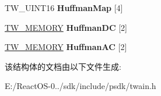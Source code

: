 \begin{DoxyCompactItemize}
T\+W\+\_\+\+U\+I\+N\+T16 {\bfseries Huffman\+Map} \mbox{[}4\mbox{]}
\item 
\mbox{\label{struct_t_w___j_p_e_g_c_o_m_p_r_e_s_s_i_o_n_a984734b0a7500ded1d92818059e5dea4}} 
\hyperlink{struct_t_w___m_e_m_o_r_y}{T\+W\+\_\+\+M\+E\+M\+O\+RY} {\bfseries Huffman\+DC} \mbox{[}2\mbox{]}
\item 
\mbox{\label{struct_t_w___j_p_e_g_c_o_m_p_r_e_s_s_i_o_n_a1444bc549146f9ad4223d143ae6b19ad}} 
\hyperlink{struct_t_w___m_e_m_o_r_y}{T\+W\+\_\+\+M\+E\+M\+O\+RY} {\bfseries Huffman\+AC} \mbox{[}2\mbox{]}
\end{DoxyCompactItemize}


该结构体的文档由以下文件生成\+:\begin{DoxyCompactItemize}
\item 
E\+:/\+React\+O\+S-\/0../sdk/include/psdk/twain.\+h\end{DoxyCompactItemize}
